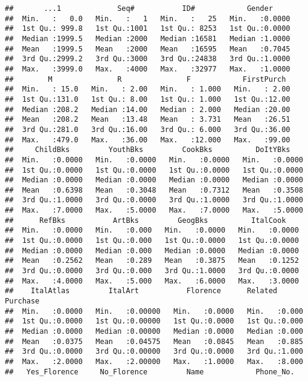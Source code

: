 \documentclass[
]{article}
\begin{document}
\begin{verbatim}
##       ...1             Seq#           ID#            Gender      
##  Min.   :   0.0   Min.   :   1   Min.   :   25   Min.   :0.0000  
##  1st Qu.: 999.8   1st Qu.:1001   1st Qu.: 8253   1st Qu.:0.0000  
##  Median :1999.5   Median :2000   Median :16581   Median :1.0000  
##  Mean   :1999.5   Mean   :2000   Mean   :16595   Mean   :0.7045  
##  3rd Qu.:2999.2   3rd Qu.:3000   3rd Qu.:24838   3rd Qu.:1.0000  
##  Max.   :3999.0   Max.   :4000   Max.   :32977   Max.   :1.0000  
##        M               R               F            FirstPurch   
##  Min.   : 15.0   Min.   : 2.00   Min.   : 1.000   Min.   : 2.00  
##  1st Qu.:131.0   1st Qu.: 8.00   1st Qu.: 1.000   1st Qu.:12.00  
##  Median :208.2   Median :14.00   Median : 2.000   Median :20.00  
##  Mean   :208.2   Mean   :13.48   Mean   : 3.731   Mean   :26.51  
##  3rd Qu.:281.0   3rd Qu.:16.00   3rd Qu.: 6.000   3rd Qu.:36.00  
##  Max.   :479.0   Max.   :36.00   Max.   :12.000   Max.   :99.00  
##     ChildBks         YouthBks         CookBks          DoItYBks     
##  Min.   :0.0000   Min.   :0.0000   Min.   :0.0000   Min.   :0.0000  
##  1st Qu.:0.0000   1st Qu.:0.0000   1st Qu.:0.0000   1st Qu.:0.0000  
##  Median :0.0000   Median :0.0000   Median :0.0000   Median :0.0000  
##  Mean   :0.6398   Mean   :0.3048   Mean   :0.7312   Mean   :0.3508  
##  3rd Qu.:1.0000   3rd Qu.:0.0000   3rd Qu.:1.0000   3rd Qu.:1.0000  
##  Max.   :7.0000   Max.   :5.0000   Max.   :7.0000   Max.   :5.0000  
##      RefBks           ArtBks         GeogBks          ItalCook     
##  Min.   :0.0000   Min.   :0.000   Min.   :0.0000   Min.   :0.0000  
##  1st Qu.:0.0000   1st Qu.:0.000   1st Qu.:0.0000   1st Qu.:0.0000  
##  Median :0.0000   Median :0.000   Median :0.0000   Median :0.0000  
##  Mean   :0.2562   Mean   :0.289   Mean   :0.3875   Mean   :0.1252  
##  3rd Qu.:0.0000   3rd Qu.:0.000   3rd Qu.:1.0000   3rd Qu.:0.0000  
##  Max.   :4.0000   Max.   :5.000   Max.   :6.0000   Max.   :3.0000  
##    ItalAtlas         ItalArt           Florence      Related Purchase
##  Min.   :0.0000   Min.   :0.00000   Min.   :0.0000   Min.   :0.000   
##  1st Qu.:0.0000   1st Qu.:0.00000   1st Qu.:0.0000   1st Qu.:0.000   
##  Median :0.0000   Median :0.00000   Median :0.0000   Median :0.000   
##  Mean   :0.0375   Mean   :0.04575   Mean   :0.0845   Mean   :0.885   
##  3rd Qu.:0.0000   3rd Qu.:0.00000   3rd Qu.:0.0000   3rd Qu.:1.000   
##  Max.   :2.0000   Max.   :2.00000   Max.   :1.0000   Max.   :8.000   
##   Yes_Florence     No_Florence         Name            Phone_No.        

\end{verbatim}
\end{document}

